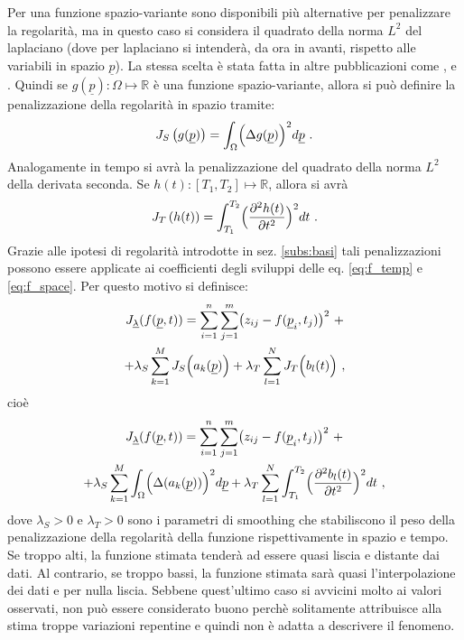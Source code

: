 \documentclass[a4paper,11pt,twoside,openright]{book}							%
\begin{document}
Per una funzione spazio-variante sono disponibili più alternative per penalizzare la regolarità, ma in questo caso si considera il quadrato della norma $L^2$ del laplaciano (dove per laplaciano si intenderà, da ora in avanti, rispetto alle variabili in spazio $\underline p$). La stessa scelta è stata fatta in altre pubblicazioni come \cite{art:ramsay}, \cite{art:sangalli} e \cite{art:wood}. Quindi se $g(\underline p): \Omega \mapsto \mathbb{R}$ è una funzione spazio-variante, allora si può definire la penalizzazione della regolarità in spazio tramite:
$$
J_S\left(g(\underline p)\right)=\int_{\Omega} \Bigl( \Delta  g(\underline p  ) \Bigr)^2 d \underline p \ .
$$
Analogamente in tempo si avrà la penalizzazione del quadrato della norma $L^2$ della derivata seconda. Se $h(t): [T_1,T_2] \mapsto \mathbb{R}$, allora si avrà
$$
J_T\left(h(t)\right)=\int_{T_1}^{T_2} \Bigl( \frac{\partial^2   h(t)   }{\partial t ^2} \Bigr)^2 dt\ .
$$
Grazie alle ipotesi di regolarità introdotte in sez. \ref{subs:basi} tali penalizzazioni possono essere applicate ai coefficienti degli sviluppi delle eq. \ref{eq:f_temp} e \ref{eq:f_space}. Per questo motivo si definisce:
\begin{multline*}
J_{\underline \lambda }(f(\underline p,t))=\sum_{i=1}^n \sum_{j=1}^m \bigl( z_{ij} - f(\underline p_i,t_j) \bigr)^2 \ + \\
+\lambda_S  \sum_{k=1}^M J_S\Bigl( a_k(\underline p)\Bigr) + \lambda_T \sum_{l=1}^N J_T \Bigl( b_l(t)\Bigr) \ ,
\end{multline*}
cioè
\begin{multline}
\label{eq:penalizzdisc}
J_{\underline \lambda }(f(\underline p,t))=\sum_{i=1}^n \sum_{j=1}^m \bigl( z_{ij} - f(\underline p_i,t_j) \bigr)^2 \ + \\
+\lambda_S  \sum_{k=1}^M \int_{\Omega} \Bigl( \Delta(  a_k(\underline p)  ) \Bigr)^2 d \underline p + \lambda_T \sum_{l=1}^N\int_{T_1}^{T_2} \Bigl( \frac{\partial^2   b_l(t)   }{\partial t ^2} \Bigr)^2 dt \ ,
\end{multline}
dove $\lambda_S>0$ e $\lambda_T>0$ sono i parametri di smoothing che stabiliscono il peso della penalizzazione della regolarità della funzione rispettivamente in spazio e tempo. Se troppo alti, la funzione stimata tenderà ad essere quasi liscia e distante dai dati. Al contrario, se troppo bassi, la funzione stimata sarà quasi l'interpolazione dei dati e per nulla liscia. Sebbene quest'ultimo caso si avvicini molto ai valori osservati, non può essere considerato buono perchè solitamente attribuisce alla stima troppe variazioni repentine e quindi non è adatta a descrivere il fenomeno.
\end{document}
